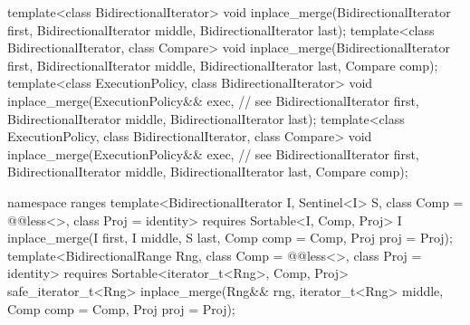 \begin{codeblock}
  template<class BidirectionalIterator>
    void inplace_merge(BidirectionalIterator first,
                       BidirectionalIterator middle,
                       BidirectionalIterator last);
  template<class BidirectionalIterator, class Compare>
    void inplace_merge(BidirectionalIterator first,
                       BidirectionalIterator middle,
                       BidirectionalIterator last, Compare comp);
  template<class ExecutionPolicy, class BidirectionalIterator>
    void inplace_merge(ExecutionPolicy&& exec, // see 
                       BidirectionalIterator first,
                       BidirectionalIterator middle,
                       BidirectionalIterator last);
  template<class ExecutionPolicy, class BidirectionalIterator, class Compare>
    void inplace_merge(ExecutionPolicy&& exec, // see 
                       BidirectionalIterator first,
                       BidirectionalIterator middle,
                       BidirectionalIterator last, Compare comp);
\end{codeblock}\begin{addedblock}\begin{codeblock}
  namespace ranges {
    template<BidirectionalIterator I, Sentinel<I> S, class Comp = @@less<>,
        class Proj = identity>
      requires Sortable<I, Comp, Proj>
      I inplace_merge(I first, I middle, S last, Comp comp = Comp{}, Proj proj = Proj{});
    template<BidirectionalRange Rng, class Comp = @@less<>, class Proj = identity>
      requires Sortable<iterator_t<Rng>, Comp, Proj>
      safe_iterator_t<Rng>
        inplace_merge(Rng&& rng, iterator_t<Rng> middle, Comp comp = Comp{},
                      Proj proj = Proj{});
  }
\end{codeblock}\end{addedblock}\begin{codeblock}


\end{codeblock}
